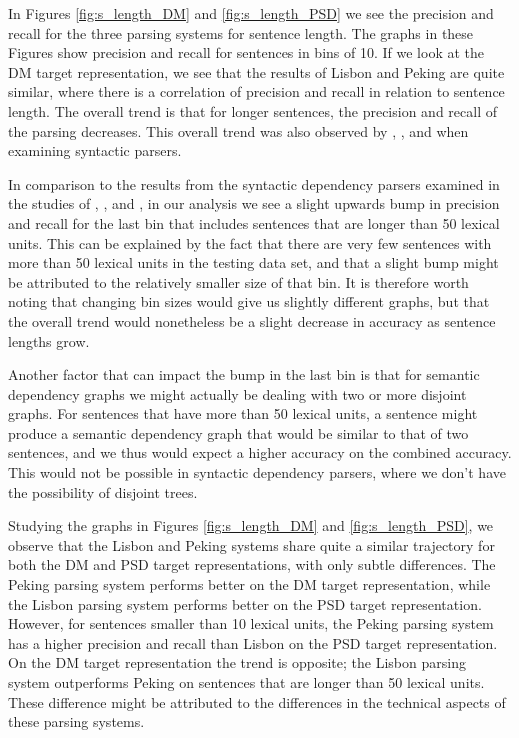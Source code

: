 In Figures \ref{fig:s_length_DM} and \ref{fig:s_length_PSD} we see the precision and recall for the three parsing systems for sentence length. The graphs in these Figures show precision and recall for sentences in bins of 10. If we look at the DM target representation, we see that the results of Lisbon and Peking are quite similar, where there is a correlation of precision and recall in relation to sentence length. The overall trend is that for longer sentences, the precision and recall of the parsing decreases. This overall trend was also observed by , , and  when examining syntactic parsers.

In comparison to the results from the syntactic dependency parsers examined in the studies of , , and , in our analysis we see a slight upwards bump in precision and recall for the last bin that includes sentences that are longer than 50 lexical units. This can be explained by the fact that there are very few sentences with more than 50 lexical units in the testing data set, and that a slight bump might be attributed to the relatively smaller size of that bin. It is therefore worth noting that changing bin sizes would give us slightly different graphs, but that the overall trend would nonetheless be a slight decrease in accuracy as sentence lengths grow.

Another factor that can impact the bump in the last bin is that for semantic dependency graphs we might actually be dealing with two or more disjoint graphs. For sentences that have more than 50 lexical units, a sentence might produce a semantic dependency graph that would be similar to that of two sentences, and we thus would expect a higher accuracy on the combined accuracy. This would not be possible in syntactic dependency parsers, where we don't have the possibility of disjoint trees.

Studying the graphs in Figures \ref{fig:s_length_DM} and \ref{fig:s_length_PSD}, we observe that the Lisbon and Peking systems share quite a similar trajectory for both the DM and PSD target representations, with only subtle differences. The Peking parsing system performs better on the DM target representation, while the Lisbon parsing system performs better on the PSD target representation. However, for sentences smaller than 10 lexical units, the Peking parsing system has a higher precision and recall than Lisbon on the PSD target representation. On the DM target representation the trend is opposite; the Lisbon parsing system outperforms Peking on sentences that are longer than 50 lexical units. These difference might be attributed to the differences in the technical aspects of these parsing systems.

